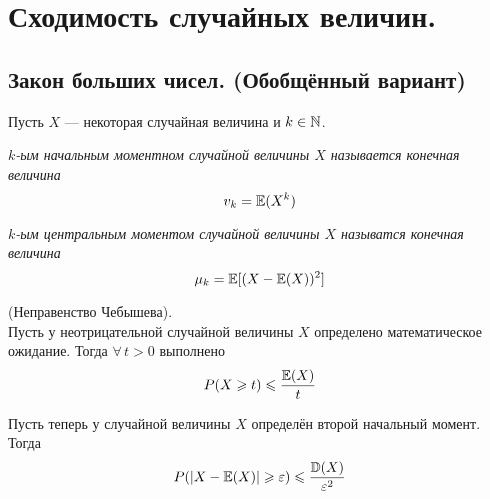 \section{Сходимость случайных величин.}
\subsection{Закон больших чисел. (Обобщённый вариант)}
Пусть $X$ --- некоторая случайная величина и $k \in \mathbb{N}$.
\begin{definition}
    \it{$k$-ым начальным моментном} случайной величины $X$ называется конечная величина
    \[
        v_k = \mathbb{E}(X^k)
    \]
\end{definition}
\begin{definition}
    \it{$k$-ым центральным моментом} случайной величины $X$ называтся конечная величина
    \[
        \mu_k = \mathbb{E}[(X - \mathbb{E}(X))^2]
    \]
\end{definition}
\begin{proposal}(Неправенство Чебышева).\\

    Пусть у неотрицательной случайной величины $X$ определено математическое ожидание. Тогда $\forall\, t > 0$ выполнено
    \[
        P(X \geqslant t) \leqslant \frac{\mathbb{E}(X)}{t}
    \]

    Пусть теперь у случайной величины $X$ определён второй начальный момент. Тогда
    \[
        P(|X - \mathbb{E}(X)| \geqslant \varepsilon) \leqslant \frac{\mathbb{D}(X)}{\varepsilon^2}
    \]
\end{proposal}
